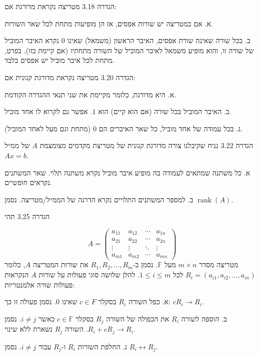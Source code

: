 \documentclass[a4paper, 11pt]{article}
\begin{document}
\begin{envbox}[defcolor]{הגדרה 3.18}
מטריצה נקראת מדורגת אם:  

א. אם במטריצה יש שורות אפסים, אז הן מופיעות מתחת לכל שאר השורות.  

ב. בכל שורה שאינה שורת אפסים, האיבר הראשון (משמאל) שאינו $0$ נקרא האיבר המוביל של שורה זו, והוא מופיע משמאל לאיבר המוביל של השורה מתחתיו (אם קיימת כזו). בפרט, מתחת לכל איבר מוביל יש אפסים בלבד.
\end{envbox}

\begin{envbox}[defcolor]{הגדרה 3.20}
מטריצה נקראת מדורגת קנונית אם:

א. היא מדורגת, כלומר מקיימת את שני תנאי ההגדרה הקודמת.  

ב. האיבר המוביל בכל שורה (אם הוא קיים) הוא $1$. אפשר גם לקרוא לו אחד מוביל.  

ג. בכל עמודה של אחד מוביל, כל שאר האיברים הם $0$ (מתחת וגם מעל לאחד המוביל).
\end{envbox}

\begin{envbox}[defcolor]{הגדרה 3.22}
נניח שקיבלנו צורה מדורגת קנונית של מטריצת מקדמים מצומצמת $A$ של ממ״ל $Ax=b$.  

א. כל משתנה שמתאים לעמודה בה מופיע איבר מוביל נקרא משתנה תלוי. שאר המשתנים נקראים חופשיים.    

ב. למספר המשתנים התלויים נקרא הדרגה של הממ״ל/מטריצה. נסמן $\mathop{\mathrm{rank}}(A)$.
\end{envbox}

\begin{envbox}[defcolor]{הגדרה 3.25}
תהי

\[
A=\begin{pmatrix}a_{11} & a_{12} & \cdots & a_{1n}\\
a_{21} & a_{22} & \cdots & a_{2n}\\
\vdots & \vdots & \ddots & \vdots\\
a_{m1} & a_{m2} & \cdots & a_{mn}
\end{pmatrix}
\]
 מטריצה מסדר $m\times n$ מעל $\mathbb F$. נסמן ב-$R_1,R_2,...,R_m$ את שורות המטריצה $A$, כלומר $R_{i}=(a_{i1},a_{i2},...,a_{in})$ לכל $1\leq i\leq m$. להלן שלושה סוגי פעולות על שורות $A$ הנקראות פעולות שורה אלמנטריות:

א. כפל השורה $R_{i}$ בסקלר $c\in F$ שאינו $0$. נסמן פעולה זו כך: $cR_{i}\rightarrow R_{i}$.  

ב. הוספה לשורה $R_{i}$ את הכפולה של השורה $R_{j}$ בסקלר $c\in \mathbb F$ כאשר $i\neq j$. נסמן $R_{i}+cR_{j}\rightarrow R_{i}$. השורה $R_{j}$ נשארת ללא שינוי.  

ג. החלפת השורות $R_{i}$ ו-$R_{j}$ עבור $i\neq j$. נסמן $R_{i}\leftrightarrow R_{j}$.
\end{envbox}
\end{document}
